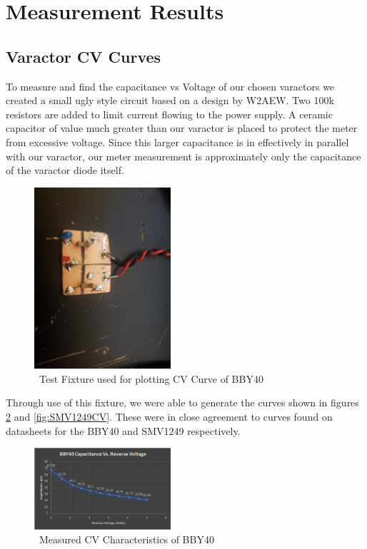 \documentclass[journal]{IEEEtran} \usepackage[english]{babel}
\begin{document}
\section{ Measurement Results }






\subsection{Varactor CV Curves}\label{subsec:CVCurves}

To measure and find the capacitance vs Voltage of our chosen varactors we
created a small ugly style circuit based on a design by W2AEW. Two 100k
resistors are added to limit current flowing to the power supply. A ceramic
capacitor of value much greater than our varactor is placed to protect the meter
from excessive voltage. Since this larger capacitance is in effectively in
parallel with our varactor, our meter measurement is approximately only the
capacitance of the varactor diode itself.

\begin{figure}[htb]
\centering
\includegraphics[width=0.45\textwidth]{BBY40_capacitance_testfixture}
\caption{\ Test Fixture used for plotting CV Curve of BBY40
}\label{fig:CVTestFixt}
\end{figure}



Through use of this fixture, we were able to generate the curves shown in
figures \ref{fig:BBY40CV} and \ref{fig:SMV1249CV}. These were in close agreement
to curves found on datasheets for the BBY40 and SMV1249 respectively.
 
\begin{figure}[htb]
\centering
\includegraphics[width=0.45\textwidth]{bbY40CV}
\caption{\ Measured CV Characteristics of BBY40 
}\label{fig:BBY40CV}
\end{figure}
 
\end{document}
